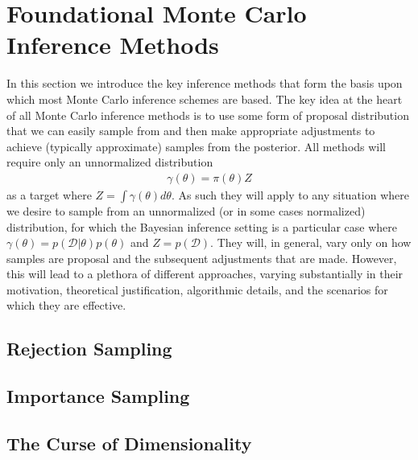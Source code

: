 
\section{Foundational Monte Carlo Inference Methods}
\label{sec:inf:foundation}

In this section we introduce the key inference methods that form
the basis upon which most Monte Carlo inference schemes are based.  The
key idea at the heart of all Monte Carlo inference methods is to use some form
of proposal distribution that we can easily sample from and then make
appropriate adjustments to achieve (typically approximate) samples from
the posterior.  All methods will require only an unnormalized distribution
\begin{align}
\label{eq:inf:unnorm-target}
\gamma(\theta) = \pi(\theta)Z
\end{align}
as a target where $Z = \int \gamma(\theta) d\theta$.  As such they will apply to
any situation where we desire to sample from an unnormalized 
(or in some cases normalized) distribution, for which
the Bayesian inference setting is a particular case where
$\gamma(\theta) = p(\mathcal{D}|\theta)p(\theta)$ and $Z = p(\mathcal{D})$.
They will, in general, vary only on how samples are proposal
and the subsequent adjustments that are made.  However, this will lead to a
plethora of different approaches, varying substantially in their motivation,
theoretical justification, algorithmic details, and the scenarios for which they
are effective.

\subsection{Rejection Sampling}
\label{sec:inf:foundation:rejection}



\subsection{Importance Sampling}
\label{sec:inf:foundation:importance}



\subsection{The Curse of Dimensionality}
\label{sec:inf:foundation:curse}



